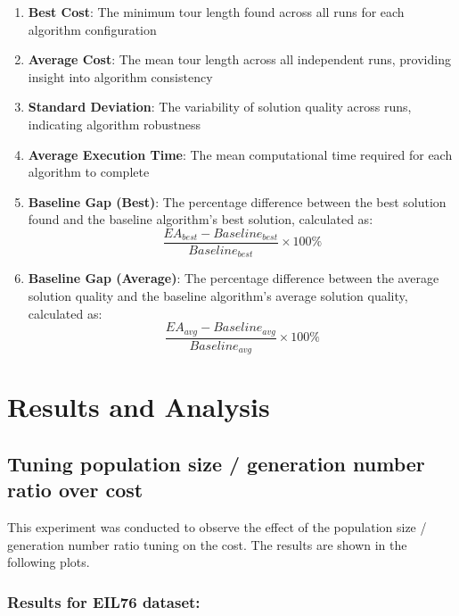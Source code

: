 \documentclass{scrartcl}
\begin{document}
\begin{enumerate}
    \item \textbf{Best Cost}: The minimum tour length found across all runs for each algorithm configuration
    
    \item \textbf{Average Cost}: The mean tour length across all independent runs, providing insight into algorithm consistency
    
    \item \textbf{Standard Deviation}: The variability of solution quality across runs, indicating algorithm robustness
    
    \item \textbf{Average Execution Time}: The mean computational time required for each algorithm to complete
        
    \item \textbf{Baseline Gap (Best)}: The percentage difference between the best solution found and the baseline algorithm's best solution, calculated as:
    \begin{equation}
    \frac{EA_{best} - Baseline_{best}}{Baseline_{best}} \times 100\%
    \end{equation}
    
    \item \textbf{Baseline Gap (Average)}: The percentage difference between the average solution quality and the baseline algorithm's average solution quality, calculated as:
    \begin{equation}
    \frac{EA_{avg} - Baseline_{avg}}{Baseline_{avg}} \times 100\%
    \end{equation}
\end{enumerate}


\section{Results and Analysis}
\label{sec:results-analysis}

\subsection[Experiment 1]{Tuning population size / generation number ratio over cost}

This experiment was conducted to observe the effect of the population size / generation number ratio tuning on the cost. The results are shown in the following plots.

\subsubsection{Results for EIL76 dataset:}
\end{document}
